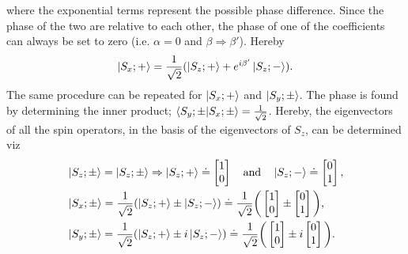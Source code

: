 \begin{example}
\begin{equation}
	\end{equation} 
	where the exponential terms represent the possible phase difference. Since the phase of the two are relative to each other, the phase of one of the coefficients can always be set to zero (i.e. $\alpha=0$ and $\beta\Rightarrow\beta'$). Hereby
	\begin{equation}
		\ket{S_x;+}=\frac{1}{\sqrt{2}}(\ket{S_z;+}+e^{i\beta'}\ket{S_z;-}).
	\end{equation} 
	The same procedure can be repeated for $\ket{S_x;+}$ and $\ket{S_y;\pm}$. The phase is found by determining the inner product; $\braket{S_y;\pm|S_x;\pm}=\frac{1}{\sqrt{2}}$. Hereby, the eigenvectors of all the spin operators, in the basis of the eigenvectors of $S_z$, can be determined viz
	\begin{equation}
		\begin{split}
			&\ket{S_z;\pm}=\ket{S_z;\pm}\Rightarrow \ket{S_z;+}\doteq\begin{bmatrix}
				1 \\
				0 \\
			\end{bmatrix} \quad \mbox{and} \quad \ket{S_z;-}\doteq\begin{bmatrix}
				0 \\
				1 \\
			\end{bmatrix},\\
			&\ket{S_x;\pm}=\frac{1}{\sqrt{2}}(\ket{S_z;+}\pm\ket{S_z;-})\doteq\frac{1}{\sqrt{2}}\bigg(\begin{bmatrix}
				1 \\
				0 \\
			\end{bmatrix}\pm\begin{bmatrix}
				0 \\
				1 \\
			\end{bmatrix}\bigg),\\
			&\ket{S_y;\pm}=\frac{1}{\sqrt{2}}(\ket{S_z;+}\pm i\ket{S_z;-})\doteq\frac{1}{\sqrt{2}}\bigg(\begin{bmatrix}
				1 \\
				0 \\
			\end{bmatrix}\pm i\begin{bmatrix}
				0 \\
				1 \\
			\end{bmatrix}\bigg).
		\end{split}

\end{equation}
\end{example}
